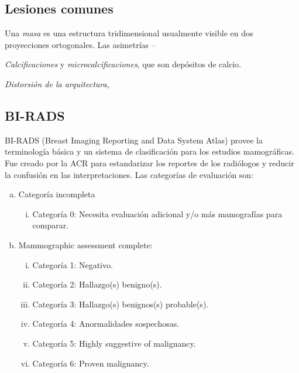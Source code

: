 \subsection{Lesiones comunes}


Una \textit{masa} es una estructura tridimensional usualmente visible en dos
proyecciones ortogonales. Las {asimetrías} --

\textit{Calcificaciones} y \textit{microcalcificaciones}, que son depósitos de calcio.

\textit{Distorsión de la arquitectura}, 

\subsection{BI-RADS}

BI-RADS (Breast Imaging Reporting and Data System Atlas)
\cite{reston2003birads} provee la terminología básica y un sistema de
clasificación para los estudios mamográficas. Fue creado por la ACR para
estandarizar los reportes de los radiólogos y reducir la confusión en las
interpretaciones. Las categorías de evaluación son:

\begin{enumerate}[a)]
    \item Categoría incompleta
    \begin{enumerate}[i.]
        \item Categoría 0: Necesita evaluación adicional y/o más mamografías para comparar.
    \end{enumerate}
    \item Mammographic assessment complete:
    \begin{enumerate}[i.]
        \item Categoría 1: Negativo.
        \item Categoría 2: Hallazgo(s) benigno(s).
        \item Categoría 3: Hallazgo(s) benignos(s) probable(s).
        \item Categoría 4: Anormalidades sospechosas.
        \item Categoría 5: Highly suggestive of malignancy.         
        \item Categoría 6: Proven malignancy.
    \end{enumerate}
\end{enumerate}

